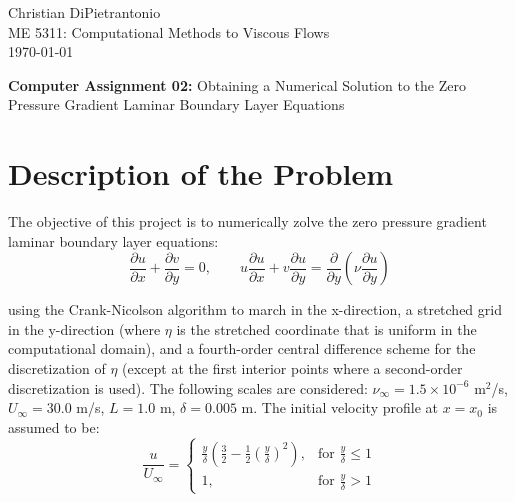 \documentclass[letterpaper,12pt]{article}
\begin{document}


Christian DiPietrantonio \\
ME 5311: Computational Methods to Viscous Flows \\
\today

\vspace{6pt}


{\large \textbf{Computer Assignment 02:} \normalsize Obtaining a Numerical Solution to the Zero Pressure Gradient Laminar Boundary Layer Equations}


\section{Description of the Problem}

The objective of this project is to numerically zolve the zero pressure gradient laminar boundary layer equations:
\begin{equation}
    \frac{\partial u}{\partial x} + \frac{\partial v}{\partial y} = 0, \qquad u \frac{\partial u}{\partial x} + v \frac{\partial u}{\partial y} = \frac{\partial}{\partial y} \left( \nu \frac{\partial u}{\partial y} \right)
\end{equation}

using the Crank-Nicolson algorithm to march in the x-direction, a stretched grid in the y-direction (where $\eta$ is the stretched coordinate that is uniform in the computational domain), and a fourth-order central difference scheme for the discretization of $\eta$ (except at the first interior points where a second-order discretization is used). The following scales are considered: $\nu_\infty = 1.5 \times 10^{-6}$ m$^2$/s, $U_\infty = 30.0$ m/s, $L = 1.0$ m, $\delta = 0.005$ m. The initial velocity profile at $x = x_0$ is assumed to be:
\begin{equation}
    \frac{u}{U_\infty} = \begin{cases} \displaystyle \frac{y}{\delta} \left(\frac{3}{2} - \frac{1}{2} \left(\frac{y}{\delta} \right)^2 \right), & \text{for } \frac{y}{\delta} \leq 1 \\[4pt] 1, & \text{for } \frac{y}{\delta} > 1 \end{cases}
\end{equation}
\end{document}
